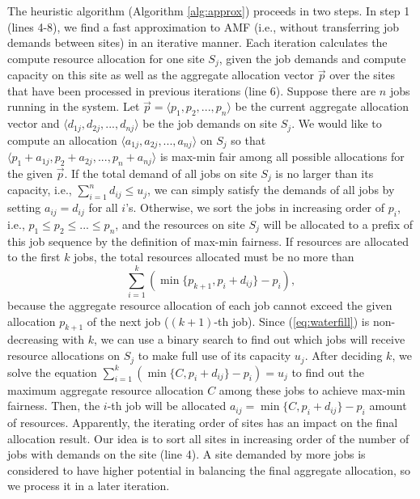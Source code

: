 The heuristic algorithm (Algorithm \ref{alg:approx}) proceeds in two steps. In step 1 (lines 4-8), we find a fast approximation to AMF (i.e., without transferring job demands between sites) in an iterative manner. Each iteration calculates the compute resource allocation for one site $S_j$, given the job demands and compute capacity on this site as well as the aggregate allocation vector $\vec p$ over the sites that have been processed in previous iterations (line 6). Suppose there are $n$ jobs running in the system. Let $\vec p = \langle p_{1}, p_{2}, ..., p_{n}\rangle$ be the current aggregate allocation vector and $\langle d_{1j}, d_{2j}, ..., d_{nj}\rangle$ be the job demands on site $S_j$. We would like to compute an allocation $\langle a_{1j}, a_{2j}, ..., a_{nj}\rangle$ on $S_j$ so that $\langle p_{1}+a_{1j}, p_{2}+a_{2j}, ..., p_{n}+a_{nj}\rangle$ is max-min fair among all possible allocations for the given $\vec p$. If the total demand of all jobs on site $S_j$ is no larger than its capacity, i.e., $\sum_{i=1}^n d_{ij} \leq u_j$, we can simply satisfy the demands of all jobs by setting $a_{ij} = d_{ij}$ for all $i$'s. Otherwise, we sort the jobs in increasing order of $p_{i}$, i.e., $p_{1} \leq p_{2} \leq ... \leq p_{n}$, and the resources on site $S_j$ will be allocated to a prefix of this job sequence by the definition of max-min fairness. If resources are allocated to the first $k$ jobs, the total resources allocated must be no more than 
\begin{equation}
\sum_{i=1}^k \left(\min\{p_{k+1}, p_i+d_{ij}\} - p_i\right),
\label{eq:waterfill}
\end{equation}
because the aggregate resource allocation of each job cannot exceed the given allocation $p_{k+1}$ of the next job ($(k+1)$-th job). Since (\ref{eq:waterfill}) is non-decreasing with $k$, we can use a binary search to find out which jobs will receive resource allocations on $S_j$ to make full use of its capacity $u_j$. After deciding $k$, we solve the equation $\sum_{i=1}^k \left(\min\{C, p_i+d_{ij}\} - p_i\right) = u_j$ to find out the maximum aggregate resource allocation $C$ among these jobs to achieve max-min fairness. Then, the $i$-th job will be allocated $a_{ij} = \min\{C, p_i+d_{ij}\} - p_i$ amount of resources. Apparently, the iterating order of sites has an impact on the final allocation result. Our idea is to sort all sites in increasing order of the number of jobs with demands on the site (line 4). A site demanded by more jobs is considered to have higher potential in balancing the final aggregate allocation, so we process it in a later iteration.

